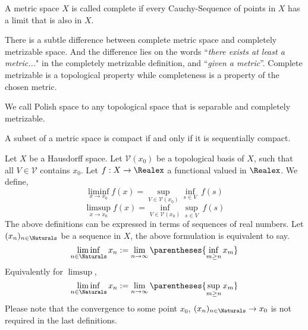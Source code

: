 \begin{definition}[Completeness]
	A metric space $X$ is called complete if every Cauchy-Sequence of points in $X$ has a limit that is also in $X$. 
\end{definition}

\begin{definition}
	
\end{definition}
There is a subtle difference between complete metric space and completely metrizable space.  And the difference lies on the words ``\textit{there exists at least a metric...}" in the completely metrizable definition, and ``\textit{given a metric}''. Complete metrizable is a topological property while completeness is a property of the chosen metric.
\begin{definition}
	We call Polish space to any topological space that is separable and completely metrizable.
\end{definition}

\begin{theorem}
	A subset of a metric space is compact if and only if it is sequentially compact.
\end{theorem}


\begin{definition}
	Let $X$ be a Hausdorff space. Let $\mathcal{V}(x_0)$ be a topological basis of $X$, such that all $V\in \mathcal{V}$ contains $x_0$. Let $f: X\rightarrow \Realex$ a functional valued in $\Realex$. We define, 
	\begin{equation*}
	\liminf_{x\rightarrow x_0} f(x)= \sup_{V\in \mathcal{V}(x_0)} \inf_{s\in V}\ f(s)
	\end{equation*}
	\begin{equation*}
	\limsup_{x\rightarrow x_0} f(x)= \inf_{V\in \mathcal{V}(x_0)} \sup_{s\in V}\ f(s)
	\end{equation*}
	The above definitions can be expressed in terms of sequences of real numbers. Let $(x_n)_{n \in \Naturals}$ be a sequence in $X$, the above formulation is equivalent to say.
	\begin{equation*}
	\liminf_{n\in \Naturals} x_n := \lim_{n\rightarrow \infty} \parentheses{\inf_{m\geq n} x_m}
	\end{equation*}
	Equivalently for $\limsup$,
	\begin{equation*}
	\liminf_{n\in \Naturals} x_n := \lim_{n\rightarrow \infty} \parentheses{\sup_{m\geq n} x_m}
	\end{equation*}
	Please note that the convergence to some point $x_0$, $(x_n)_{n\in \Naturals}\rightarrow x_0$ is not required in the last definitions.
\end{definition}


